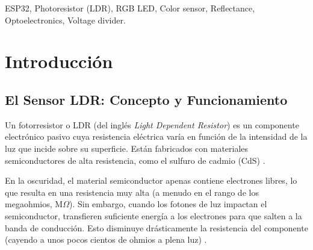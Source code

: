 \documentclass[conference]{IEEEtran}
\begin{document}
\renewcommand\abstractname{Abstract}
\begin{abstract}
This document describes the design, assembly, and calibration of an optoelectronic system capable of detecting and differentiating multiple colored cards. The system uses an ESP32 microcontroller, an RGB light-emitting diode (LED), and a photoresistor (LDR). The operating principle is based on light reflectance \cite{ldr_2}: the RGB LED sequentially illuminates the test surface with red, green, and blue light, while the LDR measures the intensity of the reflected light for each wavelength \cite{ldr_3}. By utilizing an optically isolated environment and a calibration algorithm \cite{ldr_4}, the ESP32 reads the analog variations generated in a voltage divider circuit to assign a unique spectral signature to each color. The results demonstrate that this approach is an effective, scalable, and low-cost method for classifying colored surfaces in controlled environments.
\end{abstract}

\renewcommand\IEEEkeywordsname{Keywords}
\begin{keywords}
ESP32, Photoresistor (LDR), RGB LED, Color sensor, Reflectance, Optoelectronics, Voltage divider.
\end{keywords}

\section{Introducción}

\subsection{El Sensor LDR: Concepto y Funcionamiento}
Un fotorresistor o LDR (del inglés \textit{Light Dependent Resistor}) es un componente electrónico pasivo cuya resistencia eléctrica varía en función de la intensidad de la luz que incide sobre su superficie. Están fabricados con materiales semiconductores de alta resistencia, como el sulfuro de cadmio (CdS) \cite{ldr_5}. 

En la oscuridad, el material semiconductor apenas contiene electrones libres, lo que resulta en una resistencia muy alta (a menudo en el rango de los megaohmios, $\text{M}\Omega$). Sin embargo, cuando los fotones de luz impactan el semiconductor, transfieren suficiente energía a los electrones para que salten a la banda de conducción. Esto disminuye drásticamente la resistencia del componente (cayendo a unos pocos cientos de ohmios a plena luz) \cite{ldr_6}.
\end{document}
